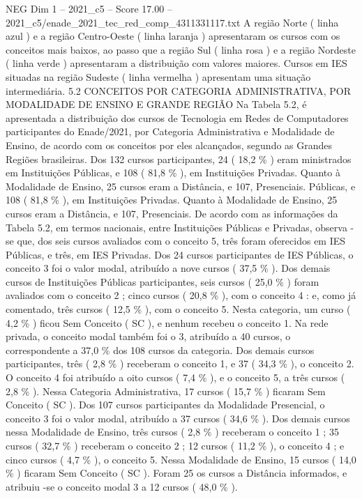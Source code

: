 \begin{textsample}{NEG Dim 1 – 2021\_c5 – Score 17.00 – 2021\_c5/enade\_2021\_tec\_red\_comp\_4311331117.txt}
A região Norte ( linha azul ) e a região Centro-Oeste ( linha laranja ) apresentaram os cursos com os conceitos mais baixos, ao passo que a região Sul ( linha rosa ) e a região Nordeste ( linha verde ) apresentaram a distribuição com valores maiores.
Cursos em IES situadas na região Sudeste ( linha vermelha ) apresentam uma situação intermediária. 5.2 CONCEITOS POR CATEGORIA ADMINISTRATIVA, POR MODALIDADE DE ENSINO E GRANDE REGIÃO Na Tabela 5.2, é apresentada a distribuição dos cursos de Tecnologia em Redes de Computadores participantes do Enade/2021, por Categoria Administrativa e Modalidade de Ensino, de acordo com os conceitos por eles alcançados, segundo as Grandes Regiões brasileiras.
Dos 132 cursos participantes, 24 ( 18,2 \% ) eram ministrados em Instituições Públicas, e 108 ( 81,8 \% ), em Instituições Privadas.
Quanto à Modalidade de Ensino, 25 cursos eram a Distância, e 107, Presenciais.
Públicas, e 108 ( 81,8 \% ), em Instituições Privadas.
Quanto à Modalidade de Ensino, 25 cursos eram a Distância, e 107, Presenciais.
De acordo com as informações da Tabela 5.2, em termos nacionais, entre Instituições Públicas e Privadas, observa -se que, dos seis cursos avaliados com o conceito 5, três foram oferecidos em IES Públicas, e três, em IES Privadas.
Dos 24 cursos participantes de IES Públicas, o conceito 3 foi o valor modal, atribuído a nove cursos ( 37,5 \% ).
Dos demais cursos de Instituições Públicas participantes, seis cursos ( 25,0 \% ) foram avaliados com o conceito 2 ; cinco cursos ( 20,8 \% ), com o conceito 4 : e, como já comentado, três cursos ( 12,5 \% ), com o conceito 5.
Nesta categoria, um curso ( 4,2 \% ) ficou Sem Conceito ( SC ), e nenhum recebeu o conceito 1.
Na rede privada, o conceito modal também foi o 3, atribuído a 40 cursos, o correspondente a 37,0 \% dos 108 cursos da categoria.
Dos demais cursos participantes, três ( 2,8 \% ) receberam o conceito 1, e 37 ( 34,3 \% ), o conceito 2.
O conceito 4 foi atribuído a oito cursos ( 7,4 \% ), e o conceito 5, a três cursos ( 2,8 \% ).
Nessa Categoria Administrativa, 17 cursos ( 15,7 \% ) ficaram Sem Conceito ( SC ).
Dos 107 cursos participantes da Modalidade Presencial, o conceito 3 foi o valor modal, atribuído a 37 cursos ( 34,6 \% ).
Dos demais cursos nessa Modalidade de Ensino, três cursos ( 2,8 \% ) receberam o conceito 1 ; 35 cursos ( 32,7 \% ) receberam o conceito 2 ; 12 cursos ( 11,2 \% ), o conceito 4 ; e cinco cursos ( 4,7 \% ), o conceito 5.
Nessa Modalidade de Ensino, 15 cursos ( 14,0 \% ) ficaram Sem Conceito ( SC ).
Foram 25 os cursos a Distância informados, e atribuiu -se o conceito modal 3 a 12 cursos ( 48,0 \% ).

\end{textsample}
